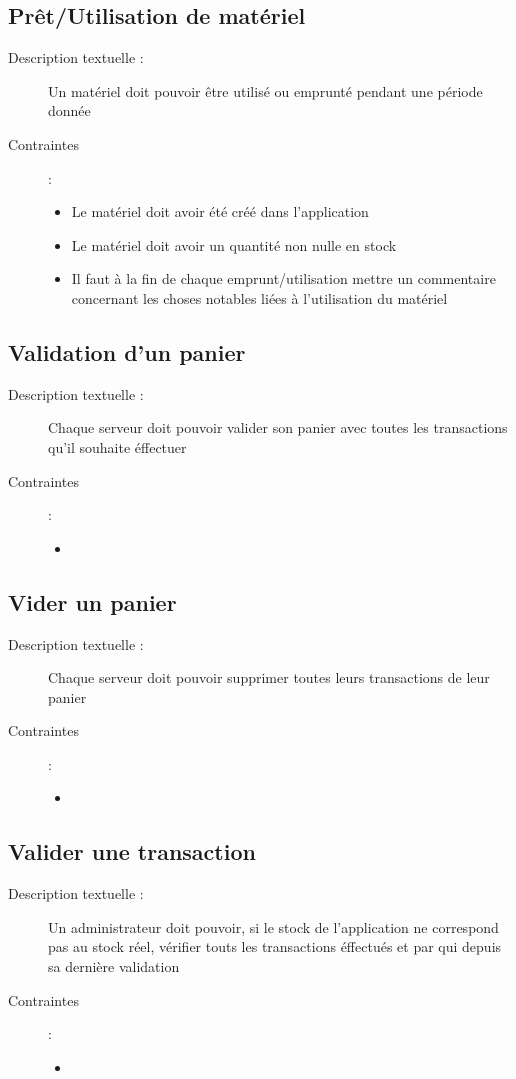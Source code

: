 \documentclass{article}
\begin{document}
  \subsection{Prêt/Utilisation de matériel}
    \begin{description}
      \item[Description textuelle :] Un matériel doit pouvoir être utilisé ou emprunté pendant une période donnée
      \item[Contraintes ]:  
        \begin{itemize}
          \item Le matériel doit avoir été créé dans l'application
          \item Le matériel doit avoir un quantité non nulle en stock
          \item Il faut à la fin de chaque emprunt/utilisation mettre un commentaire concernant les choses notables liées à l'utilisation du matériel
        \end{itemize}
    \end{description}
  \subsection{Validation d'un panier}
    \begin{description}
      \item[Description textuelle :] Chaque serveur doit pouvoir valider son panier avec toutes les transactions qu'il souhaite éffectuer
      \item[Contraintes ]:  
        \begin{itemize}
          \item 
        \end{itemize}
    \end{description}
  \subsection{Vider un panier}
    \begin{description}
      \item[Description textuelle :] Chaque serveur doit pouvoir supprimer toutes leurs transactions de leur panier
      \item[Contraintes ]:  
        \begin{itemize}
          \item 
        \end{itemize}
    \end{description}
  \subsection{Valider une transaction}
    \begin{description}
      \item[Description textuelle :] Un administrateur doit pouvoir, si le stock de l'application ne correspond pas au stock réel, vérifier touts les transactions éffectués et par qui depuis sa dernière validation
      \item[Contraintes ]:  
        \begin{itemize}
          \item 
        \end{itemize}
    \end{description}
\end{document}
